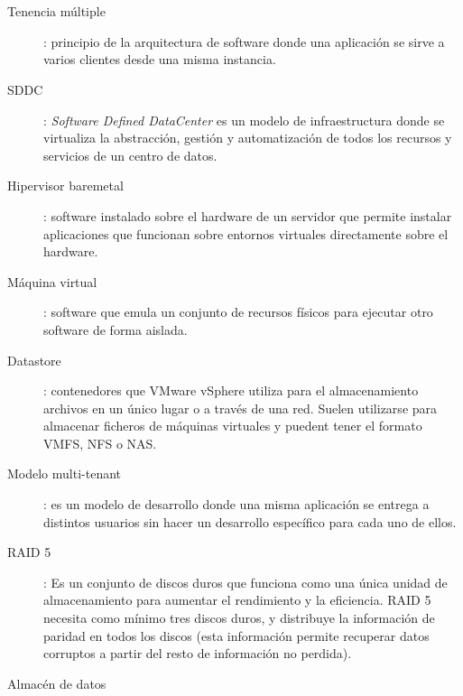 \chapter*{\nomeglosariotermos}
\label{chap:glosario-termos}


\begin{description}
 \item [Tenencia múltiple]: principio de la arquitectura de software donde una aplicación se sirve a varios clientes desde una misma instancia.
 \label{itm:tenenciamultiple}
 \item [SDDC]: \textit{Software Defined DataCenter} es un modelo de infraestructura donde se virtualiza la abstracción, gestión y automatización de todos los recursos y servicios de un centro de datos.
 \item [Hipervisor baremetal]: software instalado sobre el hardware de un servidor que permite instalar aplicaciones que funcionan sobre entornos virtuales directamente sobre el hardware.
  \label{itm:baremetal}
 \item [Máquina virtual]: software que emula un conjunto de recursos físicos para ejecutar otro software de forma aislada.
  \label{itm:vm}
 \item [Datastore]: contenedores que VMware vSphere utiliza para el almacenamiento archivos en un único lugar o a través de una red. Suelen utilizarse para almacenar ficheros de máquinas virtuales y puedent tener el formato VMFS, NFS o NAS.
 \label{itm:datastore}
 \item [Modelo multi-tenant]: es un modelo de desarrollo donde una misma aplicación se entrega a distintos usuarios sin hacer un desarrollo específico para cada uno de ellos.
 \label{itm:multitenant}
 \item [RAID 5]: Es un conjunto de discos duros que funciona como una única unidad de almacenamiento para aumentar el rendimiento y la eficiencia. RAID 5 necesita como mínimo tres discos duros, y distribuye la información de paridad en todos los discos (esta información permite recuperar datos corruptos a partir del resto de información no perdida).
 \label{itm:raid5}
 \item [Almacén de datos]

\end{description}
